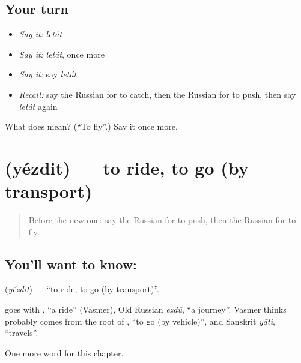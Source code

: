 \subsection*{Your turn}
\begin{itemize}
\raggedright
  \item \emph{Say it:} \emph{letát}
  \item \emph{Say it:} \emph{letát}, once more
  \item \emph{Say it:} say \emph{letát}
  \item \emph{Recall:} say the Russian for to catch, then the Russian for to push, then say \emph{letát} again
\end{itemize}

\begin{tcolorbox}[breakable,colback=teal!4,colframe=teal!35!black,title={Before you move on}]
What does  mean? (\textquotedblleft{}To fly\textquotedblright{}.) Say it once more.
\end{tcolorbox}
\section[\texorpdfstring{\ru{ездить} (yézdit)}{ездить (yézdit)}]{ (yézdit) — to ride, to go (by transport)}

\label{lesson:RU-C143-yezdit}



\begin{quote}
Before the new one: say the Russian for to push, then the Russian for to fly.
\end{quote}

\subsection*{You'll want to know: }
\textbf{} (\emph{yézdit}) — \textquotedblleft{}to ride, to go (by transport)\textquotedblright{}.

\begin{cousinweb}
\textbf{} goes with \emph{}, \textquotedblleft{}a ride\textquotedblright{} (Vasmer), Old Russian \emph{ezdŭ}, \textquotedblleft{}a journey\textquotedblright{}. Vasmer thinks \emph{} probably comes from the root of \emph{}, \textquotedblleft{}to go (by vehicle)\textquotedblright{}, and Sanskrit \emph{yāti}, \textquotedblleft{}travels\textquotedblright{}.
\end{cousinweb}

\begin{grammarlens}[title={What you've built}]
One more word for this chapter.
\end{grammarlens}

